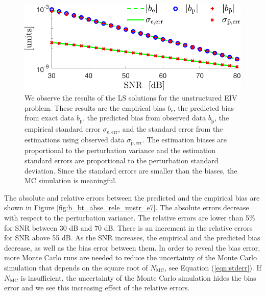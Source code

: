 \begin{figure}[htb!]
 \centering
 \includegraphics[width=0.69\columnwidth]{./ChapterStatisticalAnalysis/fig/Fig_2.pdf} 
  \caption{ \label{bias_sigma_NMC_unstr_str_n2} 
  We observe the results of the LS solutions \color{blue} for the unstructured EIV problem\color{black}. These results are the empirical bias $b_{\mathrm{e}}$, the predicted bias from exact data $b_{\mathrm{p}}$, the predicted bias from observed data $b_{\widetilde{\mathrm{p}}}$, the empirical standard error $\sigma_{\mathrm{e, err}}$, and the standard error from the estimations using observed data $\sigma_{\widetilde{\mathrm{p}}, \mathrm{err}}$. The estimation biases are proportional to the perturbation variance and the estimation standard errors are proportional to the perturbation standard deviation. Since the standard errors are smaller than the biases, the MC simulation is meaningful. }
\end{figure}

The absolute and relative errors between the predicted and the empirical bias are shown in Figure \ref{fig:b_bt_abse_rele_unstr_e7}. 
The absolute errors decrease with respect to the perturbation variance.
The relative errors are lower than 5\% for SNR between 30 dB and 70 dB. 
There is an increment in the relative errors for SNR above 55 dB. 
 As the SNR increases, the empirical and the predicted bias decrease, as well as the bias error between them.
In order to reveal the bias error, more Monte Carlo runs are needed to reduce the uncertainty of the Monte Carlo simulation that depends on the square root of $N_{\mathrm{MC}}$, see Equation (\ref{eqn:stderr}).
If $N_{\mathrm{MC}}$ is insufficient, the uncertainty of the Monte Carlo simulation hides the bias error and we see this increasing effect of the relative errors. 

